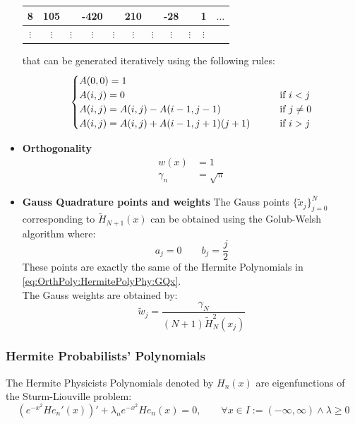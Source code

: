 \documentclass[a4paper,10pt]{article}
\begin{document}
\begin{itemize}
\begin{center}
\begin{tabular}{c|c|c|c|c|c|c|c|c|c|c}
		8 & 105 & & -420 & & 210 & & -28 & & 1 & $\ldots$ \\ \hline
		$\vdots$ & $\vdots$ & $\vdots$ & $\vdots$ & $\vdots$ & $\vdots$ & $\vdots$ & $\vdots$ & $\vdots$ & $\vdots$ & 
	\end{tabular}
	\end{center}
	that can be generated iteratively using the following rules:
	\begin{equation*}
		\begin{cases}
		A(0,0) = 1\\
		A(i,j) = 0 \qquad & \text{if $ i<j $}\\
		A(i,j) = A(i,j) - A(i-1,j-1) \qquad & \text{if $ j \neq 0 $}\\
		A(i,j) = A(i,j) + A(i-1,j+1) (j+1) \qquad & \text{if $i > j$}
		\end{cases}
	\end{equation*}
	\item \textbf{Orthogonality}\\
		\begin{align}
			w(x) &= 1 \\
			\gamma_n &= \sqrt{\pi}
		\end{align}
	\item \textbf{Gauss Quadrature points and weights}
		The Gauss points $\lbrace \tilde{x}_j \rbrace_{j=0}^N$ corresponding to $\tilde{H}_{N+1}(x)$ can be obtained using the Golub-Welsh algorithm \cite{press_numerical_2007} where:
		\begin{equation}
			a_j = 0 \qquad b_j = \frac{j}{2}
		\end{equation}
		These points are exactly the same of the Hermite Polynomials in \eqref{eq:OrthPoly:HermitePolyPhy:GQx}.\\
		The Gauss weights are obtained by:
		\begin{equation}
			\tilde{w}_j = \frac{\gamma_N}{(N+1)\tilde{H}_N^2(x_j)}
		\end{equation}
\end{itemize}

\subsubsection{Hermite Probabilists' Polynomials}
The Hermite Physicists Polynomials denoted by $H_n(x)$ are eigenfunctions of the Sturm-Liouville problem:
\begin{equation}
\left( e^{-x^2} He_n'(x) \right)' + \lambda_n e^{-x^2} He_n(x) = 0 , \qquad \forall x \in I:=(-\infty,\infty) \wedge \lambda \geq 0
\end{equation}
\end{document}
